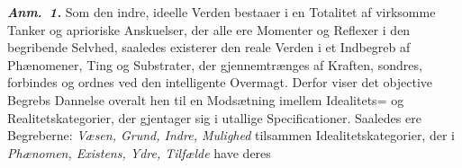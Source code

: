 \documentclass[12pt]{book}
\newcommand{\anm}[1]{\emph{\textbf{Anm.~#1.}}}
\newcommand{\opage}[1]{\marginnote{\footnotesize\textit{[#1]}}}
\begin{document}
\anm{1} Som den indre, ideelle Verden bestaaer i en Totalitet af virksomme Tanker og
aprioriske Anskuelser, der alle ere Momenter og Reflexer i den begribende Selvhed,
saaledes existerer den reale Verden i et Indbegreb af Phænomener,
\opage{204} %
Ting og Substrater, der gjennemtrænges af Kraften, sondres, forbindes og ordnes ved den
intelligente Overmagt. Derfor viser det objective Begrebs Dannelse overalt hen til en
Modsætning imellem Idealitets= og Realitetskategorier, der gjentager sig i utallige
Specificationer. Saaledes ere Begreberne: \emph{Væsen, Grund, Indre, Mulighed} tilsammen
Idealitetskategorier, der i \emph{Phænomen, Existens, Ydre, Tilfælde} have deres
\end{document}
